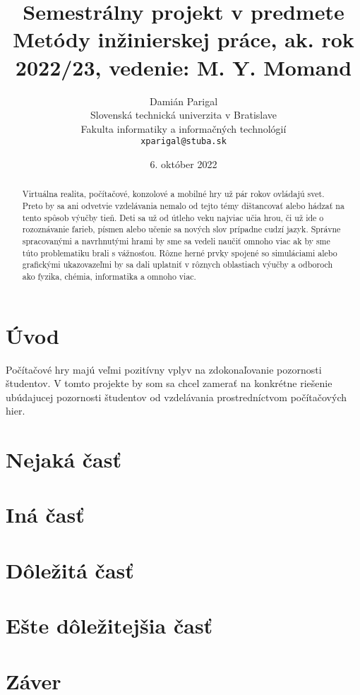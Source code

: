 \documentclass[10pt,twoside,slovak,coursepaper]{article}
\title{Semestrálny projekt v predmete Metódy inžinierskej práce, ak. rok 2022/23, vedenie: M. Y. Momand} %
\author{Damián Parigal\\[2pt]
	{\small Slovenská technická univerzita v Bratislave}\\
	{\small Fakulta informatiky a informačných technológií}\\
	{\small \texttt{xparigal@stuba.sk}}
	}
\date{\small 6. október 2022} %
\begin{document}
\maketitle

\begin{abstract}

Virtuálna realita, počítačové, konzolové a mobilné hry už pár rokov ovládajú svet. Preto by sa ani odvetvie vzdelávania nemalo od tejto témy dištancovať alebo hádzať na tento spôsob výučby tieň. Deti sa už od útleho veku najviac učia hrou, či už ide o rozoznávanie farieb, písmen alebo učenie sa nových slov prípadne cudzí jazyk. Správne spracovanými a navrhnutými hrami by sme sa vedeli naučiť omnoho viac ak by sme túto problematiku brali s vážnosťou. Rôzne herné prvky spojené so simuláciami alebo grafickými ukazovazeľmi by sa dali uplatniť v rôznych oblastiach výučby a odboroch ako fyzika, chémia, informatika a omnoho viac.

\end{abstract}



\section{Úvod}

Počítačové hry majú veľmi pozitívny vplyv na zdokonaľovanie pozornosti študentov. V tomto projekte by som sa chcel zamerať na konkrétne riešenie ubúdajucej pozornosti študentov od vzdelávania prostredníctvom počítačových hier.

\section{Nejaká časť} \label{nejaka}




\section{Iná časť} \label{ina}




\section{Dôležitá časť} \label{dolezita}




\section{Ešte dôležitejšia časť} \label{dolezitejsia}




\section{Záver} \label{zaver} %






\end{document}
